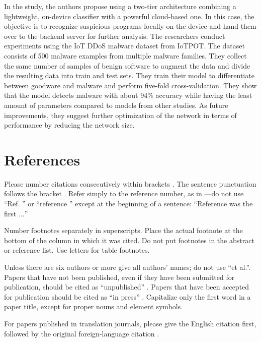 \documentclass[conference, 11pt]{IEEEtran}
\begin{document}
In the study, the authors propose using a two-tier architecture combining a lightweight, on-device classifier with a powerful cloud-based one.
In this case, the objective is to recognize suspicious programs locally on the device and hand them over to the backend server for further analysis.
The researchers conduct experiments using the IoT DDoS malware dataset from IoTPOT. The dataset consists of 500 malware examples from multiple malware families.
They collect the same number of samples of benign software to augment the data and divide the resulting data into train and test sets.
They train their model to differentiate between goodware and malware and perform five-fold cross-validation.
They show that the model detects malware with about 94\% accuracy while having the least amount of parameters compared to models from other studies.
As future improvements, they suggest further optimization of the network in terms of performance by reducing the network size.

\section*{References}

Please number citations consecutively within brackets \cite{b1}. The 
sentence punctuation follows the bracket \cite{b2}. Refer simply to the reference 
number, as in \cite{b3}---do not use ``Ref. \cite{b3}'' or ``reference \cite{b3}'' except at 
the beginning of a sentence: ``Reference \cite{b3} was the first $\ldots$''

Number footnotes separately in superscripts. Place the actual footnote at 
the bottom of the column in which it was cited. Do not put footnotes in the 
abstract or reference list. Use letters for table footnotes.

Unless there are six authors or more give all authors' names; do not use 
``et al.''. Papers that have not been published, even if they have been 
submitted for publication, should be cited as ``unpublished'' \cite{b4}. Papers 
that have been accepted for publication should be cited as ``in press'' \cite{b5}. 
Capitalize only the first word in a paper title, except for proper nouns and 
element symbols.

For papers published in translation journals, please give the English 
citation first, followed by the original foreign-language citation \cite{b6}.
\end{document}
